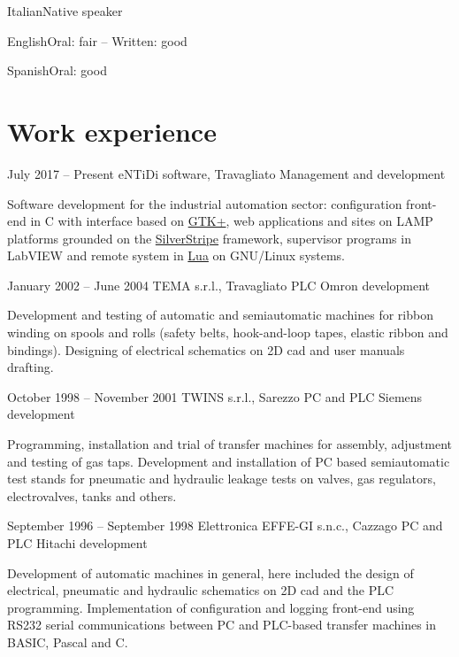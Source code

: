 \documentclass{tccv}
\begin{document}
\begin{factlist}
\item{Italian}{Native speaker}
\item{English}{Oral: fair -- Written: good}
\item{Spanish}{Oral: good}
\end{factlist}







\section{Work experience}

\begin{eventlist}

\item{July 2017 -- Present}
     {eNTiDi software, Travagliato}
     {Management and development}

Software development for the industrial automation sector: configuration
front-end in C with interface based on \href{http://www.gtk.org/}{GTK+},
web applications and sites on LAMP platforms grounded on the
\href{http://www.silverstripe.org/}{SilverStripe} framework,
supervisor programs in LabVIEW and remote system in
\href{http://www.lua.org/}{Lua} on GNU/Linux systems.

\item{January 2002 -- June 2004}
     {TEMA s.r.l., Travagliato}
     {PLC Omron development}

Development and testing of automatic and semiautomatic machines for
ribbon winding on spools and rolls (safety belts, hook-and-loop tapes,
elastic ribbon and bindings). Designing of electrical schematics on
2D cad and user manuals drafting.

\item{October 1998 -- November 2001}
     {TWINS s.r.l., Sarezzo}
     {PC and PLC Siemens development}

Programming, installation and trial of transfer machines for assembly,
adjustment and testing of gas taps. Development and installation of PC
based semiautomatic test stands for pneumatic and hydraulic leakage
tests on valves, gas regulators, electrovalves, tanks and others.

\item{September 1996 -- September 1998}
     {Elettronica EFFE-GI s.n.c., Cazzago}
     {PC and PLC Hitachi development}

Development of automatic machines in general, here included the design
of electrical, pneumatic and hydraulic schematics on 2D cad and the PLC
programming. Implementation of configuration and logging front-end using
RS232 serial communications between PC and PLC-based transfer machines
in BASIC, Pascal and C.


\end{eventlist}
\end{document}
